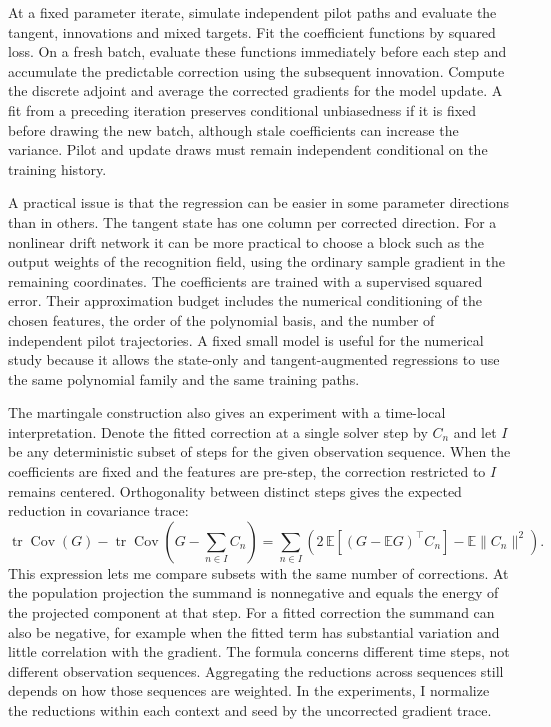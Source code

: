 \documentclass[12pt]{article}
\newcommand{\E}{\mathbb{E}}
\newcommand{\tr}{\operatorname{tr}}
\newcommand{\Cov}{\operatorname{Cov}}
\begin{document}
At a fixed parameter iterate, simulate independent pilot paths and evaluate the tangent, innovations and mixed targets. Fit the coefficient functions by squared loss. On a fresh batch, evaluate these functions immediately before each step and accumulate the predictable correction using the subsequent innovation. Compute the discrete adjoint and average the corrected gradients for the model update. A fit from a preceding iteration preserves conditional unbiasedness if it is fixed before drawing the new batch, although stale coefficients can increase the variance. Pilot and update draws must remain independent conditional on the training history.

A practical issue is that the regression can be easier in some parameter directions than in others. The tangent state has one column per corrected direction. For a nonlinear drift network it can be more practical to choose a block such as the output weights of the recognition field, using the ordinary sample gradient in the remaining coordinates. The coefficients are trained with a supervised squared error. Their approximation budget includes the numerical conditioning of the chosen features, the order of the polynomial basis, and the number of independent pilot trajectories. A fixed small model is useful for the numerical study because it allows the state-only and tangent-augmented regressions to use the same polynomial family and the same training paths.

The martingale construction also gives an experiment with a time-local interpretation. Denote the fitted correction at a single solver step by \(C_n\) and let \(I\) be any deterministic subset of steps for the given observation sequence. When the coefficients are fixed and the features are pre-step, the correction restricted to \(I\) remains centered. Orthogonality between distinct steps gives the expected reduction in covariance trace:
\[
 \tr\Cov(G)-\tr\Cov\left(G-\sum_{n\in I}C_n\right)
   =\sum_{n\in I}\left(2\,\E[(G-\E G)^\top C_n]-\E\|C_n\|^2\right).
\]
This expression lets me compare subsets with the same number of corrections. At the population projection the summand is nonnegative and equals the energy of the projected component at that step. For a fitted correction the summand can also be negative, for example when the fitted term has substantial variation and little correlation with the gradient. The formula concerns different time steps, not different observation sequences. Aggregating the reductions across sequences still depends on how those sequences are weighted. In the experiments, I normalize the reductions within each context and seed by the uncorrected gradient trace.
\end{document}
